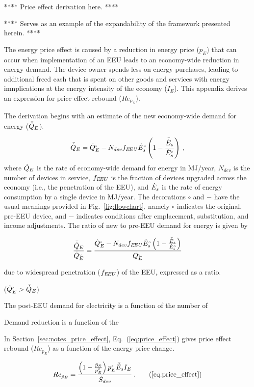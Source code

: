 

**** Price effect derivation here. ****

**** Serves as an example of the expandability 
of the framework presented herein. ****


The energy price effect is caused by a reduction 
in energy price ($p_E$)
that can occur when implementation of an EEU
leads to an economy-wide reduction in energy demand.
The device owner spends less on energy purchases, 
leading to additional freed cash
that is spent on other goods and services
with energy imnplications 
at the energy intensity of the economy ($I_E$).
This appendix derives an expression for 
price-effect rebound ($Re_{p_E}$).

The derivation begins with an estimate of the new economy-wide 
demand for energy ($\bar{\dot{Q}}_E$).

\begin{equation}
  \bar{\dot{Q}}_E = {}{\dot{Q}}^{\scriptscriptstyle \circ}_E - N_{dev} f_{E\!EU} {}{\dot{E}}^{\scriptscriptstyle \circ}_s \left( 1 - \frac{\bar{\dot{E}}_s}{{}{\dot{E}}^{\scriptscriptstyle \circ}_s} \right) \, ,
\end{equation}
%
where
$\dot{Q}_E$ is the rate of economy-wide demand for energy in MJ/year,
$N_{dev}$ is the number of devices in service, 
$f_{E\!EU}$ is the fraction of devices upgraded across the economy
(i.e., the penetration of the EEU), and
$\dot{E}_s$ is the rate of energy consumption by a single device in MJ/year.
The decorations $\circ$ and $-$ have the usual meanings
provided in Fig.~\ref{fig:flowchart}, namely 
$\circ$ indicates the original, pre-EEU device, and 
$-$ indicates conditions after 
emplacement, substitution, and income
adjustments.
The ratio of new to pre-EEU demand for energy is given by

\begin{equation}
  \frac{\bar{\dot{Q}}_E}{{}{\dot{Q}}^{\scriptscriptstyle \circ}_E} =
        \frac{{}{\dot{Q}}^{\scriptscriptstyle \circ}_E - N_{dev} f_{E\!EU} {}{\dot{E}}^{\scriptscriptstyle \circ}_s \left( 1 - \frac{\bar{\dot{E}}_s}{{}{\dot{E}}^{\scriptscriptstyle \circ}_s}  \right)}
        {{}{\dot{Q}}^{\scriptscriptstyle \circ}_E}
\end{equation}
%



due to widespread penetration ($f_{E\!EU}$) of the EEU,
expressed as a ratio.


 (${}{\dot{Q}}^{\scriptscriptstyle \circ}_E > \bar{\dot{Q}}_E$)



The post-EEU demand for electricity is a function of the number of 

Demand reduction is a function of the 

In Section~\ref{sec:notes_price_effect}, 
Eq.~(\ref{eq:price_effect}) gives
price effect rebound ($Re_{p_E}$)
as a function of the energy price change.

\begin{equation}
  Re_{p_E} = \frac{\left(1 - \frac{\ainc{p}_E}{\bempl{p}_E}\right) \orig{p}_E \rainc{E}_s I_E}{\Sdot} \, .  \tag{\ref{eq:price_effect}}
\end{equation}
%
